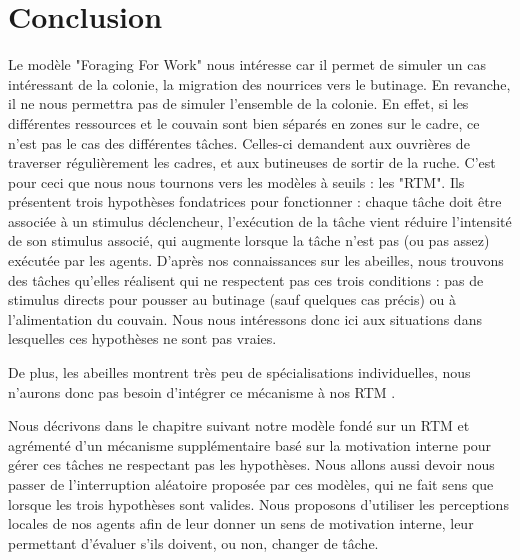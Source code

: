 			
	\section*{Conclusion}
	Le modèle "Foraging For Work" nous intéresse car il permet de simuler un cas intéressant de la colonie, la migration des nourrices vers le butinage. En revanche, il ne nous permettra pas de simuler l'ensemble de la colonie. En effet, si les différentes ressources et le couvain sont bien séparés en zones sur le cadre, ce n'est pas le cas des différentes tâches. Celles-ci demandent aux ouvrières de traverser régulièrement les cadres, et aux butineuses de sortir de la ruche. C'est pour ceci que nous nous tournons vers les modèles à seuils : les "RTM". Ils présentent trois hypothèses fondatrices pour fonctionner : chaque tâche doit être associée à un stimulus déclencheur, l'exécution de la tâche vient réduire l'intensité de son stimulus associé, qui augmente lorsque la tâche n'est pas (ou pas assez) exécutée par les agents.
	D'après nos connaissances sur les abeilles, nous trouvons des tâches qu'elles réalisent qui ne respectent pas ces trois conditions : pas de stimulus directs pour pousser au butinage (sauf quelques cas précis) ou à l'alimentation du couvain. Nous nous intéressons donc ici aux situations dans lesquelles ces hypothèses ne sont pas vraies.
	
	De plus, les abeilles montrent très peu de spécialisations individuelles, nous n'aurons donc pas besoin d'intégrer ce mécanisme à nos RTM \cite{kolmes_quantitative_1984}.
	
	 Nous décrivons dans le chapitre suivant notre modèle fondé sur un RTM et agrémenté d'un mécanisme supplémentaire basé sur la motivation interne pour gérer ces tâches ne respectant pas les hypothèses. Nous allons aussi devoir nous passer de l'interruption aléatoire proposée par ces modèles, qui ne fait sens que lorsque les trois hypothèses sont valides. Nous proposons d'utiliser les perceptions locales de nos agents afin de leur donner un sens de motivation interne, leur permettant d'évaluer s'ils doivent, ou non, changer de tâche.
